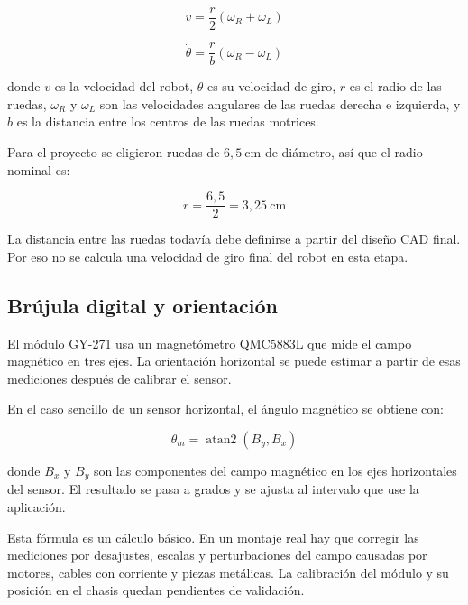 \documentclass[journal]{IEEEtran}
\begin{document}
\begin{equation}
v = \frac{r}{2}(\omega_R+\omega_L)
\label{eq:velocidad_lineal}
\end{equation}

\begin{equation}
\dot{\theta} = \frac{r}{b}(\omega_R-\omega_L)
\label{eq:velocidad_angular}
\end{equation}

donde $v$ es la velocidad del robot, $\dot{\theta}$ es su velocidad de giro, $r$ es el radio de las ruedas, $\omega_R$ y $\omega_L$ son las velocidades angulares de las ruedas derecha e izquierda, y $b$ es la distancia entre los centros de las ruedas motrices.

Para el proyecto se eligieron ruedas de $6{,}5~\mathrm{cm}$ de diámetro, así que el radio nominal es:

\begin{equation}
r = \frac{6{,}5}{2} = 3{,}25~\mathrm{cm}
\label{eq:radio_rueda}
\end{equation}

La distancia entre las ruedas todavía debe definirse a partir del diseño CAD final. Por eso no se calcula una velocidad de giro final del robot en esta etapa.

\subsection{Brújula digital y orientación}

El módulo GY-271 usa un magnetómetro QMC5883L que mide el campo magnético en tres ejes. La orientación horizontal se puede estimar a partir de esas mediciones después de calibrar el sensor.

En el caso sencillo de un sensor horizontal, el ángulo magnético se obtiene con:

\begin{equation}
\theta_m = \operatorname{atan2}(B_y,B_x)
\label{eq:rumbo}
\end{equation}

donde $B_x$ y $B_y$ son las componentes del campo magnético en los ejes horizontales del sensor. El resultado se pasa a grados y se ajusta al intervalo que use la aplicación.

Esta fórmula es un cálculo básico. En un montaje real hay que corregir las mediciones por desajustes, escalas y perturbaciones del campo causadas por motores, cables con corriente y piezas metálicas. La calibración del módulo y su posición en el chasis quedan pendientes de validación.
\end{document}
